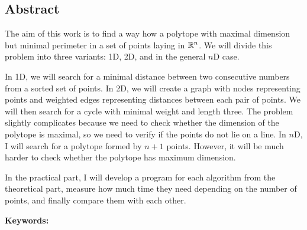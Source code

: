 \subsection*{Abstract}

The aim of this work is to find a way how a polytope with maximal dimension but minimal perimeter in a set of points laying in $\mathbb{R}^n$. We will divide this problem into three variants: 1D, 2D, and in the general $n$D case. 

In 1D, we will search for a minimal distance between two consecutive numbers from a sorted set of points. In 2D, we will create a graph with nodes representing points and weighted edges representing distances between each pair of points. We will then search for a cycle with minimal weight and length three. The problem slightly complicates because we need to check whether the dimension of the polytope is maximal, so we need to verify if the points do not lie on a line. In $n$D, I will search for a polytope formed by $n+1$ points. However, it will be much harder to check whether the polytope has maximum dimension.

In the practical part, I will develop a program for each algorithm from the theoretical part, measure how much time they need depending on the number of points, and finally compare them with each other.

\vspace{1em}
\noindent
\textbf{Keywords: }\keywordsen


